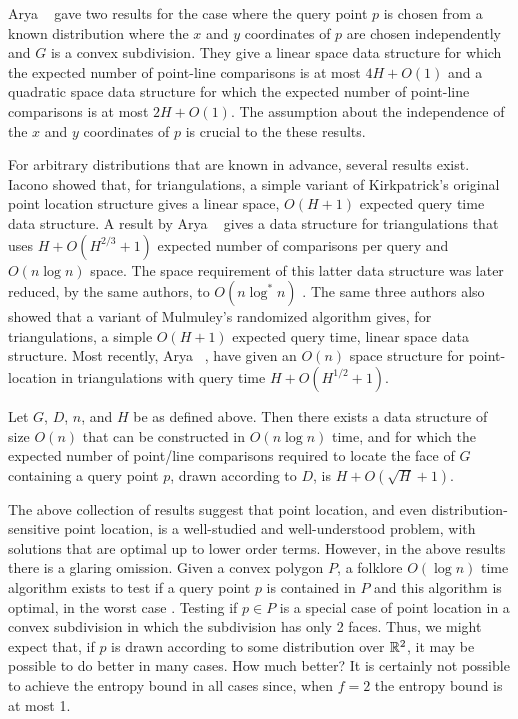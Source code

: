 \documentclass[charterfonts,lotsofwhite]{patmorin}
\begin{document}
Arya \etal\ \cite{acmr00} gave two results for the case where the
query point $p$ is chosen from a known distribution where the $x$ and
$y$ coordinates of $p$ are chosen independently and $G$ is a convex
subdivision.  They give a linear space data structure for which the
expected number of point-line comparisons is at most $4H+O(1)$ and a
quadratic space data structure for which the expected number of
point-line comparisons is at most $2H+O(1)$.  The assumption about the
independence of the $x$ and $y$ coordinates of $p$ is crucial to the
these results.

For arbitrary distributions that are known in advance, several results
exist.  Iacono \cite{i01,i04} showed that, for triangulations, a
simple variant of Kirkpatrick's original point location structure
gives a linear space, $O(H+1)$ expected query time data structure.  A
result by Arya \etal\ \cite{amm00} gives a data structure for
triangulations that uses $H + O(H^{2/3}+1)$ expected number of
comparisons per query and $O(n\log n)$ space.  The space requirement
of this latter data structure was later reduced, by the same authors,
to $O(n\log^* n)$ \cite{amm01a}.  The same three authors
\cite{amm01b} also showed that a variant of Mulmuley's randomized algorithm
gives, for triangulations, a simple $O(H+1)$ expected query time,
linear space data structure.  Most recently, Arya \etal\
\cite{ammw07}, have given an $O(n)$ space structure for point-location
in triangulations with query time $H+O(H^{1/2}+1)$. 

\begin{thm}[Arya \etal\ 2007]
Let $G$, $D$, $n$, and $H$ be as defined above.  Then there exists a
data structure of size $O(n)$ that can be constructed in $O(n\log n)$
time, and for which the expected number of point/line comparisons
required to locate the face of $G$ containing a query point $p$, drawn
according to $D$, is $H + O(\sqrt{H}+1)$.
\end{thm}
 
The above collection of results suggest that point location, and even
distribution-sensitive point location, is a well-studied and
well-understood problem, with solutions that are optimal up to
lower order terms.  However, in the above results there is a glaring
omission.  Given a convex polygon $P$, a folklore $O(\log n)$ time
algorithm exists to test if a query point $p$ is contained in $P$ and
this algorithm is optimal, in the worst case \cite{ps85}.  Testing if
$p\in P$ is a special case of point location in a convex subdivision
in which the subdivision has only 2 faces.  Thus, we might expect that, if
$p$ is drawn according to some distribution over $\mathbb{R}^2$, it may be
possible to do better in many cases. How much better?  It is certainly
not possible to achieve the entropy bound in all cases since, when
$f=2$ the entropy bound is at most 1.
\end{document}
